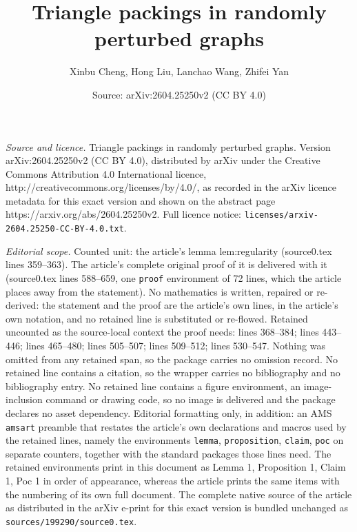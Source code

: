 \documentclass[10pt,a4paper]{amsart}
\title{Triangle packings in randomly perturbed graphs}
\author{Xinbu Cheng, Hong Liu, Lanchao Wang, Zhifei Yan}
\date{Source: arXiv:2604.25250v2 (CC BY 4.0)}
\begin{document}
\maketitle

\noindent\emph{Source and licence.} Triangle packings in randomly perturbed graphs. Version arXiv:2604.25250v2 (CC BY 4.0), distributed by arXiv under the Creative Commons Attribution 4.0 International licence, http://creativecommons.org/licenses/by/4.0/, as recorded in the arXiv licence metadata for this exact version and shown on the abstract page https://arxiv.org/abs/2604.25250v2. Full licence notice: \texttt{licenses/arxiv-2604.25250-CC-BY-4.0.txt}.\par\smallskip

\noindent\textit{Editorial scope.} Counted unit: the article's lemma lem:regularity (source0.tex lines 359--363). The article's complete original proof of it is delivered with it (source0.tex lines 588--659, one \texttt{proof} environment of 72 lines, which the article places away from the statement). No mathematics is written, repaired or re-derived: the statement and the proof are the article's own lines, in the article's own notation, and no retained line is substituted or re-flowed.  Retained uncounted as the source-local context the proof needs: lines 368--384; lines 443--446; lines 465--480; lines 505--507; lines 509--512; lines 530--547.  Nothing was omitted from any retained span, so the package carries no omission record.  No retained line contains a citation, so the wrapper carries no bibliography and no bibliography entry.  No retained line contains a figure environment, an image-inclusion command or drawing code, so no image is delivered and the package declares no asset dependency.  Editorial formatting only, in addition: an AMS \texttt{amsart} preamble that restates the article's own declarations and macros used by the retained lines, namely the environments \texttt{lemma}, \texttt{proposition}, \texttt{claim}, \texttt{poc} on separate counters, together with the standard packages those lines need.  The retained environments print in this document as Lemma 1, Proposition 1, Claim 1, Poc 1 in order of appearance, whereas the article prints the same items with the numbering of its own full document.  The complete native source of the article as distributed in the arXiv e-print for this exact version is bundled unchanged as \texttt{sources/199290/source0.tex}.
\end{document}

